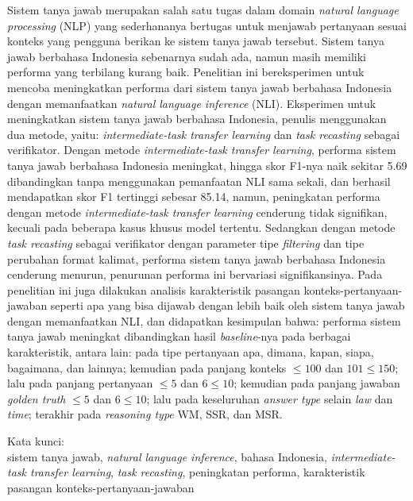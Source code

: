 \noindent Sistem tanya jawab merupakan salah satu tugas dalam domain \emph{natural language processing} (NLP) yang sederhananya bertugas untuk menjawab pertanyaan sesuai konteks yang pengguna berikan ke sistem tanya jawab tersebut. Sistem tanya jawab berbahasa Indonesia sebenarnya sudah ada, namun masih memiliki performa yang terbilang kurang baik. Penelitian ini bereksperimen untuk mencoba meningkatkan performa dari sistem tanya jawab berbahasa Indonesia dengan memanfaatkan \emph{natural language inference} (NLI). Eksperimen untuk meningkatkan sistem tanya jawab berbahasa Indonesia, penulis menggunakan dua metode, yaitu: \emph{intermediate-task transfer learning} dan \emph{task recasting} sebagai verifikator. Dengan metode \emph{intermediate-task transfer learning}, performa sistem tanya jawab berbahasa Indonesia meningkat, hingga skor F1-nya naik sekitar 5.69 dibandingkan tanpa menggunakan pemanfaatan NLI sama sekali, dan berhasil mendapatkan skor F1 tertinggi sebesar 85.14, namun, peningkatan performa dengan metode \emph{intermediate-task transfer learning} cenderung tidak signifikan, kecuali pada beberapa kasus khusus model tertentu. Sedangkan dengan metode \emph{task recasting} sebagai verifikator dengan parameter tipe \emph{filtering} dan tipe perubahan format kalimat, performa sistem tanya jawab berbahasa Indonesia cenderung menurun, penurunan performa ini bervariasi signifikansinya. Pada penelitian ini juga dilakukan analisis karakteristik pasangan konteks-pertanyaan-jawaban seperti apa yang bisa dijawab dengan lebih baik oleh sistem tanya jawab dengan memanfaatkan NLI, dan didapatkan kesimpulan bahwa: performa sistem tanya jawab meningkat dibandingkan hasil \emph{baseline}-nya pada berbagai karakteristik, antara lain: pada tipe pertanyaan apa, dimana, kapan, siapa, bagaimana, dan lainnya; kemudian pada panjang konteks $\leq100$ dan $101\leq150$; lalu pada panjang pertanyaan $\leq5$ dan $6\leq10$; kemudian pada panjang jawaban \emph{golden truth} $\leq5$ dan $6\leq10$; lalu pada keseluruhan \emph{answer type} selain \emph{law} dan \emph{time}; terakhir pada \emph{reasoning type} WM, SSR, dan MSR.\\

\vspace*{0.2cm}

\noindent Kata kunci: \\ sistem tanya jawab, \emph{natural language inference}, bahasa Indonesia, \emph{intermediate-task transfer learning}, \emph{task recasting}, peningkatan performa, karakteristik pasangan konteks-pertanyaan-jawaban \\

\newpage

